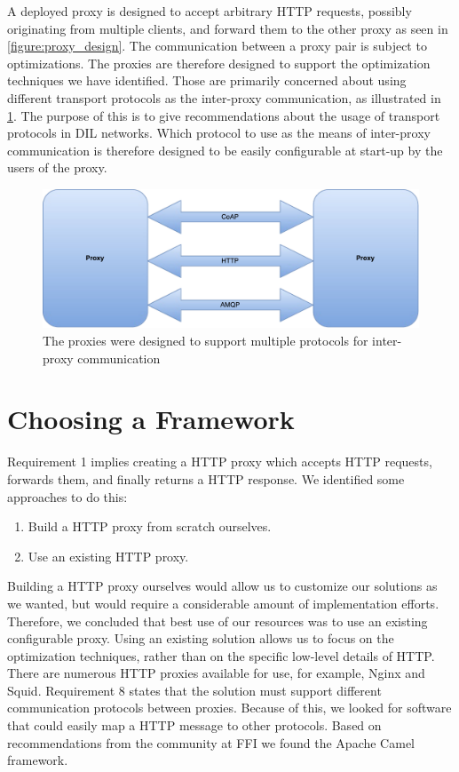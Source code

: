A deployed proxy is designed to accept arbitrary HTTP requests, possibly
originating from multiple clients, and forward them to the other proxy as seen
in \cref{figure:proxy_design}. The communication between a proxy pair is subject
to optimizations. The proxies are therefore designed to support the optimization
techniques we have identified. Those are primarily concerned about using
different transport protocols as the inter-proxy communication, as illustrated
in \cref{figure:proxy-communication}. The purpose of this is to give
recommendations about the usage of transport protocols in DIL networks. Which
protocol to use as the means of inter-proxy communication is therefore designed
to be easily configurable at start-up by the users of the proxy.


\begin{figure}[h]
\includegraphics[scale=0.5]{images/proxy_communcation.pdf}
\caption{The proxies were designed to support multiple protocols for inter-proxy communication}
\label{figure:proxy-communication}
\end{figure}


\section{Choosing a Framework}

Requirement 1 implies creating a HTTP proxy which accepts HTTP requests,
forwards them, and finally returns a HTTP response. We identified some
approaches to do this:

\begin{enumerate}
    \item Build a HTTP proxy from scratch ourselves.
    \item Use an existing HTTP proxy.
\end{enumerate}

Building a HTTP proxy ourselves would allow us to customize our solutions as we
wanted, but would require a considerable amount of implementation efforts.
Therefore, we concluded that best use of our resources was to use an existing
configurable proxy. Using an existing solution allows us to focus on the
optimization techniques, rather than on the specific low-level details of HTTP.
There are numerous HTTP proxies available for use, for example,
Nginx\cite{nginx-homepage} and Squid\cite{squid-homepage}. Requirement 8 states
that the solution must support different communication protocols between
proxies. Because of this, we looked for software that could easily map a HTTP
message to other protocols. Based on recommendations from the community at FFI
we found the Apache Camel framework.

